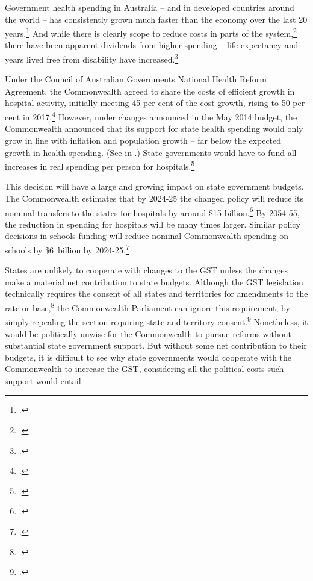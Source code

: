 Government health spending in Australia – and in developed countries around the world – has consistently grown much faster than the economy over the last 20 years.\footcites[][25--27]{DaleyWoodWeidmannEtAl2014}[][17]{DaleyMcGannonHunter2014}  And while there is clearly scope to reduce costs in parts of the system,\footcites{DuckettBreadonGinnivanEtAl2013}{DuckettBreadonRomanesEtAl2015}  there have been apparent dividends from higher spending – life expectancy and years lived free from disability have increased.\footcite[][16]{Daley2015}  

Under the Council of Australian Governments National Health Reform Agreement, the Commonwealth agreed to share the costs of efficient growth in hospital activity, initially meeting 45 per cent of the cost growth, rising to 50 per cent in 2017.\footcite[][13]{COAG2011}  However, under changes announced in the May 2014 budget, the Commonwealth announced that its support for state health spending would only grow in line with inflation and population growth – far below the expected growth in health spending. (See  in .)  State governments would have to fund all increases in real spending per person for hospitals.\footcite[][Budget Paper No.~2, p.~126]{Treasury2014-Budget-Papers-2014-15}  

This decision will have a large and growing impact on state government budgets. The Commonwealth estimates that by 2024-25 the changed policy will reduce its nominal transfers to the states for hospitals by around \$15 billion.\footcite[][115]{SenateEconomicsLegislationCommittee2014}  By 2054-55, the reduction in spending for hospitals will be many times larger.  Similar policy decisions in schools funding will reduce nominal Commonwealth spending on schools by \$6~billion by 2024-25.\footcite[][115]{SenateEconomicsLegislationCommittee2014}

States are unlikely to cooperate with changes to the GST unless the changes make a material net contribution to state budgets. Although the GST legislation technically requires the consent of all states and territories for amendments to the rate or base,\footcite[][\S11]{GST-Act-Rate-Base-1999}  the Commonwealth Parliament can ignore this requirement, by simply repealing the section requiring state and territory consent.\footcite{Twomey2003}  Nonetheless, it would be politically unwise for the Commonwealth to pursue reforms without substantial state government support. But without some net contribution to their budgets, it is difficult to see why state governments would cooperate with the Commonwealth to increase the GST, considering all the political costs such support would entail. 

